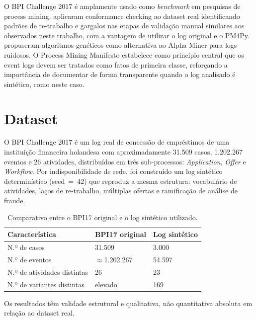 \documentclass[12pt,a4paper]{article}
\begin{document}
O BPI Challenge 2017 é amplamente usado como \textit{benchmark} em pesquisas de process mining. \cite{caro2019} aplicaram conformance checking ao dataset real identificando padrões de re-trabalho e gargalos nas etapas de validação manual similares aos observados neste trabalho, com a vantagem de utilizar o log original e o PM4Py. \cite{medeiros2007} propuseram algoritmos genéticos como alternativa ao Alpha Miner para logs ruidosos. O Process Mining Manifesto \cite{manifesto2011} estabelece como princípio central que os event logs devem ser tratados como fatos de primeira classe, reforçando a importância de documentar de forma transparente quando o log analisado é sintético, como neste caso.

\section{Dataset}
\label{sec:dataset}

O BPI Challenge 2017 \cite{vanDongen2017} é um log real de concessão de empréstimos de uma instituição financeira holandesa com aproximadamente 31.509 casos, 1.202.267 eventos e 26 atividades, distribuídos em três sub-processos: \textit{Application}, \textit{Offer} e \textit{Workflow}. Por indisponibilidade de rede, foi construído um log sintético determinístico (seed~=~42) que reproduz a mesma estrutura: vocabulário de atividades, laços de re-trabalho, múltiplas ofertas e ramificação de análise de fraude.

\begin{table}[htbp]
\centering
\caption{Comparativo entre o BPI17 original e o log sintético utilizado.}
\label{tab:dataset}
\begin{tabularx}{\textwidth}{Xll}
\toprule
\textbf{Característica} & \textbf{BPI17 original} & \textbf{Log sintético} \\
\midrule
N.º de casos                & 31.509             & 3.000 \\
N.º de eventos              & $\approx$1.202.267 & 54.597 \\
N.º de atividades distintas & 26                 & 23 \\
N.º de variantes distintas  & elevado            & 169 \\
\bottomrule
\end{tabularx}
\end{table}

Os resultados têm validade estrutural e qualitativa, não quantitativa absoluta em relação ao dataset real.
\end{document}
